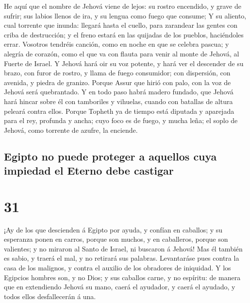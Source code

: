  He aquí que el nombre de Jehová viene de lejos: su
rostro encendido, y grave de sufrir; sus labios llenos de ira, y su
lengua como fuego que consume;  Y su aliento, cual
torrente que inunda: llegará hasta el cuello, para zarandear las gentes
con criba de destrucción; y el freno estará en las quijadas de los
pueblos, haciéndoles errar.  Vosotros tendréis canción,
como en noche en que se celebra pascua; y alegría de corazón, como el
que va con flauta para venir al monte de Jehová, al Fuerte de Israel.
 Y Jehová hará oir su voz potente, y hará ver el
descender de su brazo, con furor de rostro, y llama de fuego consumidor;
con dispersión, con avenida, y piedra de granizo.  Porque
Assur que hirió con palo, con la voz de Jehová será quebrantado.
 Y en todo paso habrá madero fundado, que Jehová hará
hincar sobre él con tamboriles y vihuelas, cuando con batallas de altura
peleará contra ellos.  Porque Topheth ya de tiempo está
diputada y aparejada para el rey, profunda y ancha; cuyo foco es de
fuego, y mucha leña; el soplo de Jehová, como torrente de azufre, la
enciende.

\hypertarget{egipto-no-puede-proteger-a-aquellos-cuya-impiedad-el-eterno-debe-castigar}{%
\subsection{Egipto no puede proteger a aquellos cuya impiedad el Eterno
debe
castigar}\label{egipto-no-puede-proteger-a-aquellos-cuya-impiedad-el-eterno-debe-castigar}}

\hypertarget{section-30}{%
\section{31}\label{section-30}}

 ¡Ay de los que descienden á Egipto por ayuda, y confían
en caballos; y su esperanza ponen en carros, porque son muchos, y en
caballeros, porque son valientes; y no miraron al Santo de Israel, ni
buscaron á Jehová!  Mas él también es sabio, y traerá el
mal, y no retirará sus palabras. Levantaráse pues contra la casa de los
malignos, y contra el auxilio de los obradores de iniquidad.
 Y los Egipcios hombres son, y no Dios; y sus caballos
carne, y no espíritu: de manera que en extendiendo Jehová su mano, caerá
el ayudador, y caerá el ayudado, y todos ellos desfallecerán á una.


